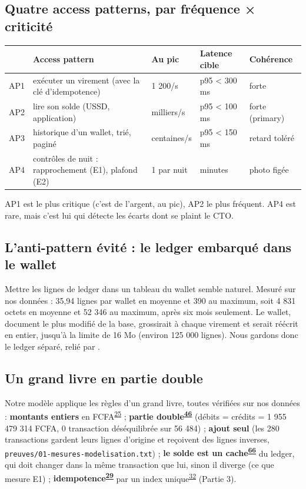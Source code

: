 \documentclass[11pt,a4paper]{article}
\newcommand{\code}[1]{\texttt{\detokenize{#1}}}
\newcommand{\gl}[1]{\textsuperscript{\hyperlink{lex#1}{#1}}}
\newcommand{\preuve}[1]{\texttt{preuves/#1}}
\begin{document}
	\subsection{Quatre access patterns, par fréquence × criticité}
	\begin{center}\small
		\begin{tabularx}{\linewidth}{@{}lLlll@{}}
			\toprule
			& \textbf{Access pattern} & \textbf{Au pic} & \textbf{Latence cible} & \textbf{Cohérence} \\
			\midrule
			AP1 & exécuter un virement (avec la clé d'idempotence) & 1 200/s & p95 < 300 ms & forte \\
			AP2 & lire son solde (USSD, application) & milliers/s & p95 < 100 ms & forte (primary) \\
			AP3 & historique d'un wallet, trié, paginé & centaines/s & p95 < 150 ms & retard toléré \\
			AP4 & contrôles de nuit : rapprochement (E1), plafond (E2) & 1 par nuit & minutes & photo figée \\
			\bottomrule
		\end{tabularx}
	\end{center}
	AP1 est le plus critique (c'est de l'argent, au pic), AP2 le plus fréquent. AP4 est rare, mais c'est lui qui détecte les écarts dont se plaint le CTO.
	
	\subsection{L'anti-pattern évité : le ledger embarqué dans le wallet}
	Mettre les lignes de ledger dans un tableau du wallet semble naturel. Mesuré sur nos données : 35,94 lignes par wallet en moyenne et 390 au maximum, soit 4 831 octets en moyenne et 52 346 au maximum, après six mois seulement. Le wallet, document le plus modifié de la base, grossirait à chaque virement et serait réécrit en entier, jusqu'à la limite de 16 Mo (environ 125 000 lignes). Nous gardons donc le ledger séparé, relié par \code{walletId}.
	
	\subsection{Un grand livre en partie double}
	Notre modèle applique les règles d'un grand livre, toutes vérifiées sur nos données : \textbf{montants entiers} en FCFA\gl{25} ; \textbf{partie double\gl{46}} (débits = crédits = 1 955 479 314 FCFA, 0 transaction déséquilibrée sur 56 484) ; \textbf{ajout seul} (les 280 transactions \code{REVERSED} gardent leurs lignes d'origine et reçoivent des lignes inverses, \preuve{01-mesures-modelisation.txt}) ; \textbf{le solde est un cache\gl{66}} du ledger, qui doit changer dans la même transaction que lui, sinon il diverge (ce que mesure E1) ; \textbf{idempotence\gl{29}} par un index unique\gl{32} (Partie 3).
	
\end{document}
